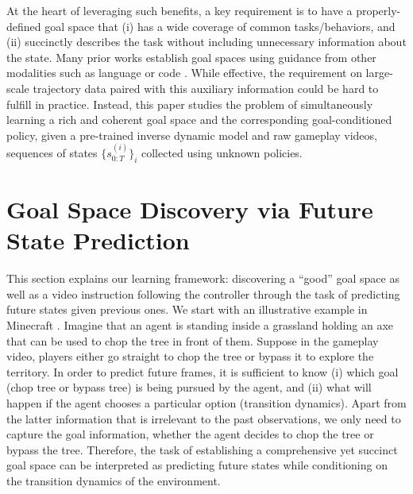\documentclass[11pt, a4paper, logo, one column]{craftjarvis}
\begin{document}
At the heart of leveraging such benefits, a key requirement is to have a properly-defined goal space that (i) has a wide coverage of common tasks/behaviors, and (ii) succinctly describes the task without including unnecessary information about the state. Many prior works establish goal spaces using guidance from other modalities such as language \citep{vlnbert,openvlm, worldmc} or code \citep{voyager, voxposer}. While effective, the requirement on large-scale trajectory data paired with this auxiliary information could be hard to fulfill in practice. Instead, this paper studies the problem of simultaneously learning a rich and coherent goal space and the corresponding goal-conditioned policy, given a pre-trained inverse dynamic model and raw gameplay videos, \ie sequences of states $\{ s_{0:T}^{(i)} \}_i$ collected using unknown policies. 



\section{Goal Space Discovery via Future State Prediction}
\label{sec:theory}

This section explains our learning framework: discovering a ``good'' goal space as well as a video instruction following the controller through the task of predicting future states given previous ones. We start with an illustrative example in Minecraft \citep{malmo}. Imagine that an agent is standing inside a grassland holding an axe that can be used to chop the tree in front of them. Suppose in the gameplay video, players either go straight to chop the tree or bypass it to explore the territory. In order to predict future frames, it is sufficient to know (i) which goal (chop tree or bypass tree) is being pursued by the agent, and (ii) what will happen if the agent chooses a particular option (\ie transition dynamics). Apart from the latter information that is irrelevant to the past observations, we only need to capture the goal information, \ie whether the agent decides to chop the tree or bypass the tree. Therefore, the task of establishing a comprehensive yet succinct goal space can be interpreted as predicting future states while conditioning on the transition dynamics of the environment. 
\end{document}
